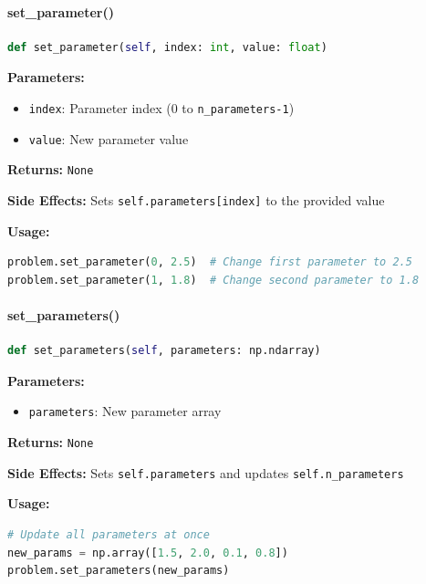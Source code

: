 \paragraph{set\_parameter()}\leavevmode
\begin{lstlisting}[language=Python, caption=Set Parameter Method]
def set_parameter(self, index: int, value: float)
\end{lstlisting}

\textbf{Parameters:}
\begin{itemize}
    \item \texttt{index}: Parameter index (0 to \texttt{n\_parameters-1})
    \item \texttt{value}: New parameter value
\end{itemize}

\textbf{Returns:} \texttt{None}

\textbf{Side Effects:} Sets \texttt{self.parameters[index]} to the provided value

\textbf{Usage:}
\begin{lstlisting}[language=Python, caption=Set Parameter Usage]
problem.set_parameter(0, 2.5)  # Change first parameter to 2.5
problem.set_parameter(1, 1.8)  # Change second parameter to 1.8
\end{lstlisting}

\paragraph{set\_parameters()}\leavevmode
\begin{lstlisting}[language=Python, caption=Set Parameters Method]
def set_parameters(self, parameters: np.ndarray)
\end{lstlisting}

\textbf{Parameters:}
\begin{itemize}
    \item \texttt{parameters}: New parameter array
\end{itemize}

\textbf{Returns:} \texttt{None}

\textbf{Side Effects:} Sets \texttt{self.parameters} and updates \texttt{self.n\_parameters}

\textbf{Usage:}
\begin{lstlisting}[language=Python, caption=Set Parameters Usage]
# Update all parameters at once
new_params = np.array([1.5, 2.0, 0.1, 0.8])
problem.set_parameters(new_params)
\end{lstlisting}

